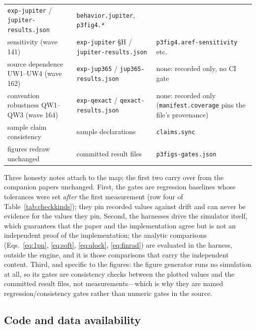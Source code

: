 \documentclass[aps,reprint,amsmath,amssymb,nofootinbib,superscriptaddress,floatfix]{revtex4-2}
\begin{document}
\begin{center}
{\begin{tabularx}{\columnwidth}{@{}YYY@{}}
  \texttt{exp-jupiter} / \texttt{jupiter-\allowbreak results.json} &
  \texttt{behavior.\allowbreak jupiter}, \texttt{p3fig4.*} \\
sensitivity (wave 141) &
  \texttt{exp-jupiter} \S H / \texttt{jupiter-\allowbreak results.json} &
  \texttt{p3fig4.\allowbreak aref-sensitivity} etc. \\
source dependence UW1--UW4 (wave 162) &
  \texttt{exp-jup365} / \texttt{jup365-\allowbreak results.json} &
  none: recorded only, no CI gate \\
convention robustness QW1--QW3 (wave 164) &
  \texttt{exp-qexact} / \texttt{qexact-\allowbreak results.json} &
  none: recorded only (\texttt{manifest.\allowbreak coverage} pins the
  file's provenance) \\
sample claim consistency & sample declarations &
  \texttt{claims.sync} \\
figures redraw unchanged & committed result files &
  \texttt{p3figs-\allowbreak gates.json} \\
\bottomrule
\end{tabularx}}
\end{center}

Three honesty notes attach to the map; the first two carry over from the
companion papers unchanged.
First, the gates are regression baselines whose tolerances were set
\emph{after} the first measurement (row four of
Table~\ref{tab:checkkinds}); they pin recorded values against drift and
can never be evidence for the values they pin.
Second, the harnesses drive the simulator itself, which guarantees that
the paper and the implementation agree but is not an independent proof
of the implementation; the analytic comparisons
(Eqs.~\ref{eq:1pn}, \ref{eq:soft}, \ref{eq:qlock},
\ref{eq:finrad}) are evaluated in the harness, outside the engine, and
it is those comparisons that carry the independent content.
Third, and specific to the figures: the figure generator runs no
simulation at all, so its gates are consistency checks between the
plotted values and the committed result files, not measurements---which
is why they are named regression/consistency gates rather than numeric
gates in the source.

\subsection{Code and data availability}
\label{sec:avail}
\end{document}
